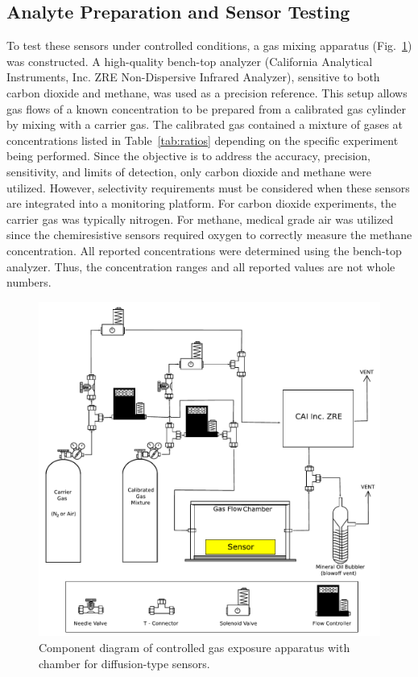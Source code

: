 \documentclass[preprint,sort&compress]{elsarticle}
\begin{document}
		\subsection{Analyte Preparation and Sensor Testing}
		
			To test these sensors under controlled conditions, a gas mixing apparatus (Fig.~\ref{fig:exposureapparatus}) was constructed.  A high-quality bench-top analyzer (California Analytical Instruments, Inc. ZRE Non-Dispersive Infrared Analyzer), sensitive to both carbon dioxide and methane, was used as a precision reference. This setup allows gas flows of a known concentration to be prepared from a calibrated gas cylinder by mixing with a carrier gas.  The calibrated gas contained a mixture of gases at concentrations listed in Table~\ref{tab:ratios} depending on the specific experiment being performed.  Since the objective is to address the accuracy, precision, sensitivity, and limits of detection, only carbon dioxide and methane were utilized.  However, selectivity requirements must be considered when these sensors are integrated into a monitoring platform.  For carbon dioxide experiments, the carrier gas was typically nitrogen.  For methane, medical grade air was utilized since the chemiresistive sensors required oxygen to correctly measure the methane concentration.  All reported concentrations were determined using the bench-top analyzer.  Thus, the concentration ranges and all reported values are not whole numbers.	  
			
			\begin{figure}[!t]
				\centering
				\includegraphics[width=\columnwidth]{honey1.pdf}
				\caption{Component diagram of controlled gas exposure apparatus with chamber for diffusion-type sensors.}
				\label{fig:exposureapparatus}
			\end{figure}
				
\end{document}
